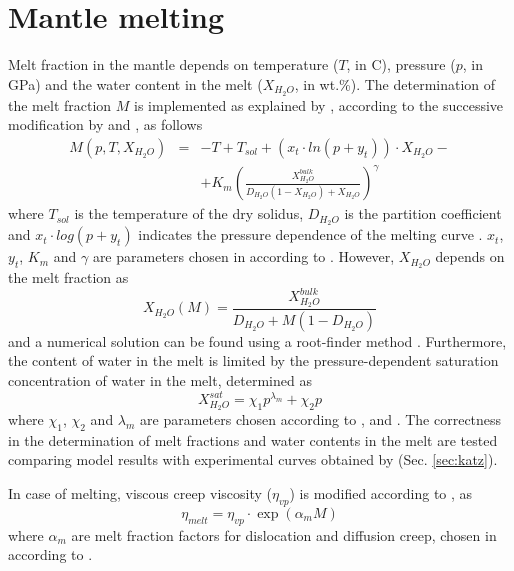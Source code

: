 \documentclass[hidelinks,10pt,a4paper]{article}
\begin{document}
\section{Mantle melting}\label{sec:melt}
Melt fraction in the mantle depends on temperature ($T$, in \textdegree C), pressure ($p$, in \si{\giga\pascal}) and the water content in the melt ($X_{H_2O}$, in wt.\%).
The determination of the melt fraction $M$ is implemented as explained by \citet{Katz2003}, according to the successive modification by \citet{Langmuir2006} and
\citet{Kelley2010}, as follows
\begin{eqnarray}\label{eq:melt_fr}
M(p,T,X_{H_2O})&=&-T+T_{sol}+(x_t\cdot ln(p+y_t))\cdot X_{H_2O}-\nonumber\\
&&+K_m\left(\frac{X_{H_2O}^{bulk}}{D_{H_2O}(1-X_{H_2O})+X_{H_2O}}\right)^{\gamma}
\end{eqnarray}
where $T_{sol}$ is the temperature of the dry solidus, $D_{H_2O}$ is the partition coefficient and $x_t\cdot log(p+y_t)$ indicates the pressure dependence of
the melting curve \citep{Kelley2010}. $x_t$, $y_t$, $K_m$ and $\gamma$ are parameters chosen in according to \citet{Kelley2010}.
However, $X_{H_2O}$ depends on the melt fraction as
\begin{equation}\label{eq:melt_wt}
X_{H_2O}(M)=\frac{X_{H_2O}^{bulk}}{D_{H_2O}+M(1-D_{H_2O})}
\end{equation}
and a numerical solution can be found using a root-finder method \citep{Katz2003,Wang2016}. Furthermore, the content of water in the melt is limited by the
pressure-dependent saturation concentration of water in the melt, determined as
\begin{equation}\label{eq:melt_max}
X_{H_2O}^{sat}=\chi_1 p^{\lambda_m}+\chi_2 p
\end{equation}
where $\chi_1$, $\chi_2$ and $\lambda_m$ are parameters chosen according to \citet{Katz2003}, \citet{Langmuir2006} and \citet{Kelley2010}. The correctness in
the determination of melt fractions and water contents in the melt are tested comparing model results with experimental curves obtained by \citet{Katz2003}
(Sec. \ref{sec:katz}).

In case of melting, viscous creep viscosity ($\eta_{vp}$) is modified according to \citet{Wang2016}, as
\begin{equation}\label{eq:melt_visc}
\eta_{melt}=\eta_{vp}\cdot \exp(\alpha_m M)
\end{equation}
where $\alpha_m$ are melt fraction factors for dislocation and diffusion creep, chosen in according to \citet{Wang2016}.
\end{document}
